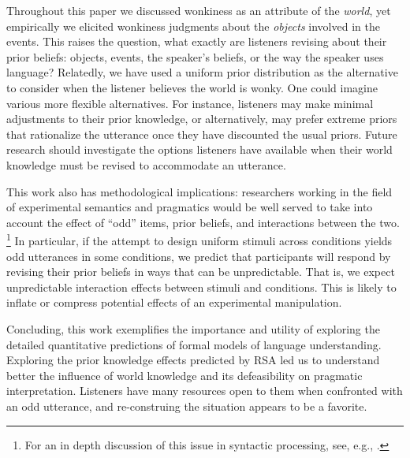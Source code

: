 \documentclass[10pt,letterpaper]{article}
\newcommand{\red}[1]{\textcolor{Red}{#1}}
\begin{document}
Throughout this paper we discussed wonkiness as an attribute of the \emph{world}, yet empirically we elicited wonkiness judgments about the \emph{objects} involved in the events. 
This raises the question, what exactly are listeners revising about their prior beliefs: objects, events, the speaker's beliefs, or the way the speaker uses language? 
Relatedly, we have used a uniform prior distribution as the alternative to consider when the listener believes the world is wonky.  One could imagine various more flexible alternatives. For instance, listeners may make minimal adjustments to their prior knowledge, or alternatively, may prefer extreme priors that rationalize the utterance once they have discounted the usual priors.
Future research should investigate the options listeners have available when their world knowledge must be revised to accommodate an utterance.

This work also has methodological implications: researchers working in the field of experimental semantics and pragmatics would be well served to take into account the effect of ``odd'' items, prior beliefs, and interactions between the two. \footnote{For an in depth discussion of this issue in syntactic processing, see, e.g., .} In particular, if the attempt to design uniform stimuli across conditions yields odd utterances in some conditions, we predict that participants will respond by revising their prior beliefs in ways that can be unpredictable. That is, we expect unpredictable interaction effects between stimuli and conditions. This is likely to inflate or compress potential effects of an experimental manipulation. 

Concluding, this work exemplifies the importance and utility of exploring the detailed quantitative predictions of formal models of language understanding.
Exploring the prior knowledge effects predicted by RSA led us to understand better the influence of world knowledge and its defeasibility on pragmatic interpretation.
Listeners have many resources open to them when confronted with an odd utterance, and re-construing the situation appears to be a favorite.
\end{document}
